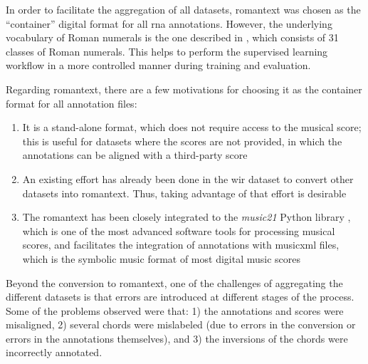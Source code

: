 
In order to facilitate the aggregation of all datasets,
\gls{romantext} was chosen as the ``container'' digital
format for all \gls{rna} annotations. However, the
underlying vocabulary of Roman numerals is the one described
in , which
consists of 31 classes of Roman numerals. This helps to
perform the supervised learning workflow in a more
controlled manner during training and evaluation.

Regarding \gls{romantext}, there are a few motivations for
choosing it as the container format for all annotation
files:

\begin{enumerate} 
    \item It is a stand-alone format, which does not require
    access to the musical score; this is useful for datasets
    where the scores are not provided, in which the
    annotations can be aligned with a third-party score
    \item An existing effort has already been done in the
    \gls{wir} dataset
    \parencite{gotham2019romantext, gotham2022openscore}
    to convert other datasets into \gls{romantext}. Thus,
    taking advantage of that effort is desirable 
    \item The \gls{romantext} has been closely integrated to
    the \emph{music21} Python library
    \parencite{cuthbert2010music21}, which is one of the
    most advanced software tools for processing musical
    scores, and facilitates the integration of annotations
    with \gls{musicxml} files, which is the symbolic music
    format of most digital music scores 
\end{enumerate}

Beyond the conversion to \gls{romantext}, one of the
challenges of aggregating the different datasets is that
errors are introduced at different stages of the process.
Some of the problems observed were that: 1) the annotations
and scores were misaligned, 2) several chords were
mislabeled (due to errors in the conversion or errors in the
annotations themselves), and 3) the inversions of the chords
were incorrectly annotated.


